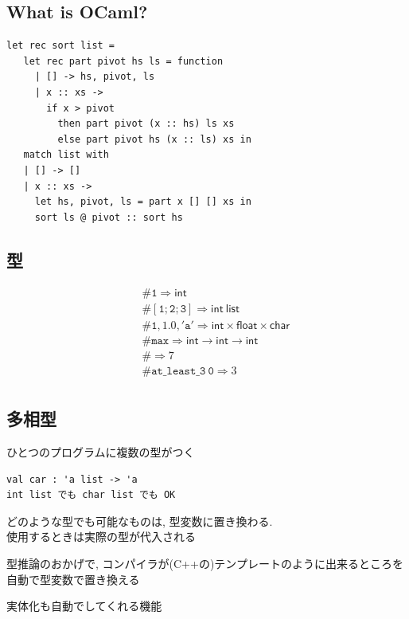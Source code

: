 \documentclass[papersize,30pt,slide]{jsarticle}
\begin{document}
\subsection{What is OCaml?}
\begin{verbatim}
let rec sort list =
   let rec part pivot hs ls = function
     | [] -> hs, pivot, ls
     | x :: xs ->
       if x > pivot
         then part pivot (x :: hs) ls xs
         else part pivot hs (x :: ls) xs in
   match list with
   | [] -> []
   | x :: xs ->
     let hs, pivot, ls = part x [] [] xs in
     sort ls @ pivot :: sort hs
\end{verbatim}


\newpage
\subsection{型}
\begin{eqnarray*}
&&\mathtt{\# 1} \Longrightarrow \mathsf{int}\\
&&\mathtt{\# [1; 2; 3]} \Longrightarrow \mathsf{int~list}\\
&&\mathtt{\# 1, 1.0, 'a'} \Longrightarrow \mathsf{int} \times \mathsf{float} \times \mathsf{char} \\
&&\mathtt{\# max} \Longrightarrow \mathsf{int} \rightarrow \mathsf{int} \rightarrow \mathsf{int}\\
&&\mathtt{\# } \Longrightarrow 7\\
&&\mathtt{\# at\_least\_3~0} \Longrightarrow 3\\
\end{eqnarray*}

\newpage
\subsection{多相型}
ひとつのプログラムに複数の型がつく

\begin{verbatim}
val car : 'a list -> 'a
int list でも char list でも OK
\end{verbatim}

どのような型でも可能なものは, 型変数に置き換わる.\\
使用するときは実際の型が代入される

\vspace{1em}

型推論のおかげで, コンパイラが(C++の)テンプレートのように出来るところを自動で型変数で置き換える

実体化も自動でしてくれる機能

\newpage
\end{document}
